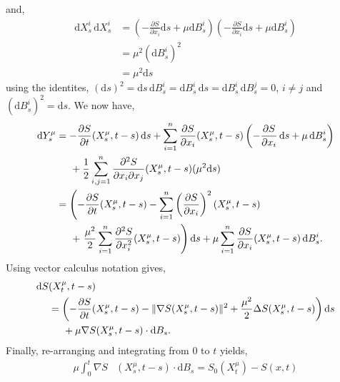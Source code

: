 \documentclass[a4paper,12pt,draft]{report}
\begin{document}
{and,
\begin{align}
\mathrm{d}X^{i}_{s}\,\mathrm{d}X^{i}_{s} & = \left(-\frac{\partial S}{\partial x_{i}}\mathrm{d}s + \mu\mathrm{d}B_s^i\right)\left(-\frac{\partial S}{\partial x_{i}}\mathrm{d}s + \mu\mathrm{d}B_s^i\right) \nonumber \\
& = \mu^2(\mathrm{d}B_s^i)^2 \nonumber \\
& = \mu^2\mathrm{d}s \nonumber
\end{align}
using the identites, $(\mathrm{d}s)^2 = \mathrm{d}s\,\mathrm{d}B_s^i = \mathrm{d}B_s^i\,\mathrm{d}s = \mathrm{d}B_s^i\,\mathrm{d}B_s^j = 0$, $i \ne j$ and $(\mathrm{d}B_s^i)^2 = \mathrm{d}s$.  We now have,
\begin{align}
\mathrm{d}Y^{\mu}_{s} & = -\frac{\partial S}{\partial t}(X^{\mu}_{s}, t - s)\,\mathrm{d}s + \sum_{i = 1}^n \frac{\partial S}{\partial x_{i}}(X^{\mu}_{s}, t - s)\left(-\frac{\partial S}{\partial x_{i}}\,\mathrm{d}s + \mu\,\mathrm{d}B_s^i\right)\nonumber\\
& \hspace{0.5cm} + \frac{1}{2}\sum_{i, j = 1}^{n} \frac{\partial^2 S}{\partial x_{i} \partial x_{j}}(X^{\mu}_{s}, t - s)(\mu^2\mathrm{d}s)\nonumber\\
& = \left(-\frac{\partial S}{\partial t}(X^{\mu}_{s}, t - s) - \sum_{i = 1}^n \left(\frac{\partial S}{\partial x_{i}}\right)^2(X^{\mu}_{s}, t - s)\right.\nonumber\\
& \hspace{0.5cm} + \left.\frac{\mu^2}{2}\sum_{i = 1}^{n} \frac{\partial^2 S}{\partial x_{i}^2}(X^{\mu}_{s}, t - s)\right)\mathrm{d}s + \mu\sum_{i = 1}^n \frac{\partial S}{\partial x_{i}}(X^{\mu}_{s}, t - s)\,\mathrm{d}B_s^i.\nonumber
\end{align}
Using vector calculus notation gives,
\begin{align}
\mathrm{d}S & (X^{\mu}_{t}, t - s)\nonumber\\
& = \left(-\frac{\partial S}{\partial t}(X^{\mu}_{s}, t - s) - \|\nabla S(X^{\mu}_{s}, t - s)\|^2 + \frac{\mu^2}{2}\Delta S(X^{\mu}_{s}, t - s)\right)\mathrm{d}s\nonumber\\
& \hspace{0.5cm} + \mu\nabla S(X^{\mu}_{s}, t - s)\cdot\mathrm{d}B_{s}.\nonumber
\end{align}
Finally, re-arranging and integrating from $0$ to $t$ yields,
\begin{align}
\mu\int _0^t\nabla S&(X^{\mu}_{s}, t - s)\cdot\mathrm{d}B_{s} = S_{0}(X^{\mu}_{t}) - S(x, t)\nonumber\\

\end{align}}
\end{document}

